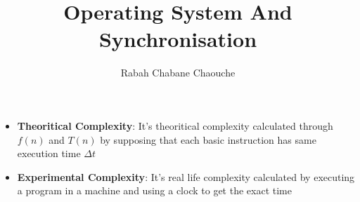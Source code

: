 \documentclass{article}
\title{Operating System And Synchronisation}
\author{Rabah Chabane Chaouche }
\begin{document}
\maketitle


\begin{tcolorbox}[enhanced, colback=white!90!greenPlot, colframe=green, coltitle=white, fonttitle=\bfseries\Large, title=Some Terminology, boxrule=1mm, arc=0.5mm, drop shadow=gray]
\begin{itemize}
    \item \textbf{Theoritical Complexity}: It's theoritical complexity calculated through \(f(n)\) and \(T(n)\) by supposing that each basic instruction has same execution time \(\Delta t\)
    \item \textbf{Experimental Complexity}: It's real life complexity calculated by executing a program in a machine and using a clock to get the exact time
\end{itemize}
\end{tcolorbox}


 
\end{document}
